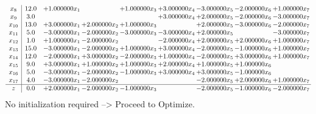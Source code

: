 \documentclass[10pt]{article}
\begin{document}
\[\begin{array}{c| c c@{\hskip 2pt} c@{\hskip 2pt} c@{\hskip 2pt} c@{\hskip 2pt} c@{\hskip 2pt} c@{\hskip 2pt} c@{\hskip 2pt} }
 x_{8}   &  12.0 & + 1.000000 x_{1} &   & + 1.000000 x_{3} & + 3.000000 x_{4} & -3.000000 x_{5} & -2.000000 x_{6} & + 1.000000 x_{7}\\
 x_{9}   &  3.0  &    &    &   & + 3.000000 x_{4} & + 2.000000 x_{5} & -2.000000 x_{6} & -3.000000 x_{7}\\
 x_{10}   &  13.0 & + 3.000000 x_{1} & + 2.000000 x_{2} & + 1.000000 x_{3} &   & + 2.000000 x_{5} & -3.000000 x_{6} & -2.000000 x_{7}\\
 x_{11}   &  5.0 & -3.000000 x_{1} & -2.000000 x_{2} & -3.000000 x_{3} & -3.000000 x_{4} & + 2.000000 x_{5} &   & -3.000000 x_{7}\\
 x_{12}   &  1.0 & + 1.000000 x_{1} & -2.000000 x_{2} &   & -2.000000 x_{4} & + 2.000000 x_{5} & + 2.000000 x_{6} & + 1.000000 x_{7}\\
 x_{13}   &  15.0 & -3.000000 x_{1} & -2.000000 x_{2} & + 1.000000 x_{3} & + 3.000000 x_{4} & -2.000000 x_{5} & -1.000000 x_{6} & + 1.000000 x_{7}\\
 x_{14}   &  12.0 & -2.000000 x_{1} & + 3.000000 x_{2} & -2.000000 x_{3} & + 1.000000 x_{4} & -2.000000 x_{5} & + 3.000000 x_{6} & + 1.000000 x_{7}\\
 x_{15}   &  9.0 & + 3.000000 x_{1} & + 1.000000 x_{2} & + 1.000000 x_{3} & + 2.000000 x_{4} & + 1.000000 x_{5} & + 1.000000 x_{6} &   \\
 x_{16}   &  5.0 & -3.000000 x_{1} & -2.000000 x_{2} & -1.000000 x_{3} & + 3.000000 x_{4} & + 3.000000 x_{5} & -1.000000 x_{6} &   \\
 x_{17}   &  4.0 & -3.000000 x_{1} & -2.000000 x_{2} &    &   & -2.000000 x_{5} & + 2.000000 x_{6} & + 1.000000 x_{7}\\
\hline
z    &  0.0 & + 2.000000 x_{1} & -2.000000 x_{2} & -1.000000 x_{3} &   & -2.000000 x_{5} & -1.000000 x_{6} & -2.000000 x_{7}\\
\end{array}\]
No initialization required --> Proceed to Optimize. 
\end{document}
